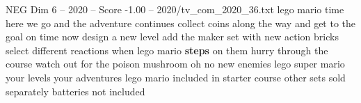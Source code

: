 \begin{textsample}{NEG Dim 6 – 2020 – Score -1.00 – 2020/tv\_com\_2020\_36.txt}  \label{ex:f6_neg_059}
lego mario time here we go and the adventure continues collect coins along the way and get to the goal on time now design a new level add the maker set with new action bricks select different reactions when lego mario \textbf{steps} on them hurry through the course watch out for the poison mushroom oh no new enemies lego super mario your levels your adventures lego mario included in starter course other sets sold separately batteries not included

\end{textsample}

